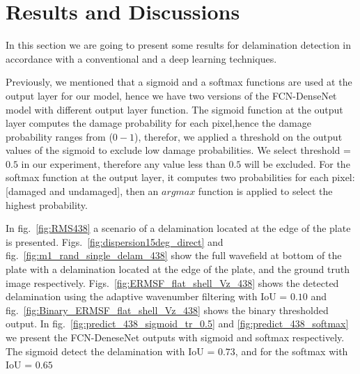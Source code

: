 \section{Results and Discussions}
	In this section we are going to present some results for delamination detection in accordance with a conventional and a deep learning techniques. 
	
	Previously, we mentioned that a sigmoid and a softmax functions are used at the output layer for our model, hence we have two versions of the FCN-DenseNet model with different output layer function.
	The sigmoid function at the output layer computes the damage probability for each pixel,hence the damage probability ranges from (\(0 - 1\)), therefor, we applied a threshold on the output values of the sigmoid to exclude low damage probabilities. We select threshold = \(0.5\) in our experiment, therefore any value less than \(0.5\) will be excluded.
	For the softmax function at the output layer, it computes two probabilities for each pixel: [damaged and undamaged], then an \(argmax\) function is applied to select the highest probability. 


	In fig.~\ref{fig:RMS438} a scenario of a delamination located at the edge of the plate is presented.
	Figs.~\ref{fig:dispersion15deg_direct} and fig.~\ref{fig:m1_rand_single_delam_438} show the full wavefield at bottom  of the plate with a delamination located at the edge of the plate, and the ground truth image respectively.
	Figs.~\ref{fig:ERMSF_flat_shell_Vz_438} shows the detected delamination using the adaptive wavenumber filtering with IoU = \(0.10\) and fig.~\ref{fig:Binary_ERMSF_flat_shell_Vz_438} shows the binary thresholded output.
	In fig.~\ref{fig:predict_438_sigmoid_tr_0.5} and \ref{fig:predict_438_softmax} we present the FCN-DeneseNet outputs with sigmoid and softmax respectively.
	The sigmoid detect the delamination with IoU = \(0.73\), and for the softmax with IoU = \(0.65\)

